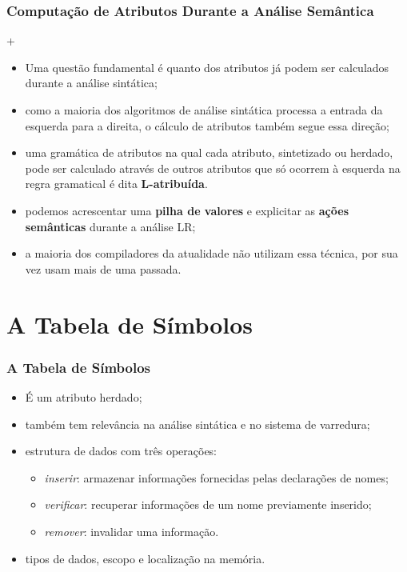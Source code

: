 \documentclass[table]{beamer}
\begin{document}
\begin{frame}
   \frametitle{Computação de Atributos Durante a Análise Semântica}+
   \begin{itemize}
      \item Uma questão fundamental é quanto dos atributos já podem ser calculados durante a análise sintática;
      \item como a maioria dos algoritmos de análise sintática processa a entrada da esquerda para a direita, o cálculo de atributos também segue essa direção;
      \item uma gramática de atributos na qual cada atributo, sintetizado ou herdado, pode ser calculado através de outros atributos que só ocorrem à esquerda na regra gramatical é dita \textbf{L-atribuída}.
      \item podemos acrescentar uma \textbf{pilha de valores} e explicitar as \textbf{ações semânticas} durante a análise LR;
      \item a maioria dos compiladores da atualidade não utilizam essa técnica, por sua vez usam mais de uma passada.
   \end{itemize}
\end{frame}

\section{A Tabela de Símbolos}
\begin{frame}
   \frametitle{A Tabela de Símbolos}
   \begin{itemize}
      \item É um atributo herdado;
      \item também tem relevância na análise sintática e no sistema de varredura;
      \item estrutura de dados com três operações:
      \begin{itemize}
         \item \textit{inserir}: armazenar informações fornecidas pelas declarações de nomes;
	 \item \textit{verificar}: recuperar informações de um nome previamente inserido;
	 \item \textit{remover}: invalidar uma informação.
      \end{itemize}
      \item tipos de dados, escopo e localização na memória.
   \end{itemize}
\end{frame}
\end{document}
